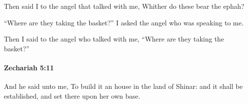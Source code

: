 			\begin{versebox}
					\item[BHS] 
					\item[LXX] 
					\item[ASV] Then said I to the angel that talked with me, Whither do these bear the ephah?
					\item[NIV] “Where are they taking the basket?” I asked the angel who was speaking to me.
					\item[NRSV] Then I said to the angel who talked with me, “Where are they taking the basket?”
			\end{versebox}

		\paragraph{Zechariah 5:11} %
			\label{ZECHARIAH-5-11}

			And he said unto me, To build it an house in the land of Shinar: and it shall be established, and set there upon her own base.

